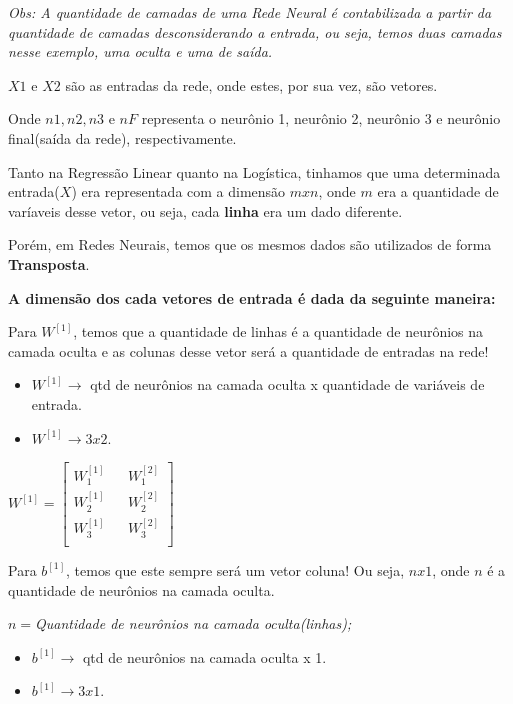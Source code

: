 \documentclass[12pt]{article}
\providecommand{\tightlist}{%
\setlength{\itemsep}{0pt}\setlength{\parskip}{0pt}}
\begin{document}
\emph{Obs: A quantidade de camadas de uma Rede Neural é contabilizada a
partir da quantidade de camadas desconsiderando a entrada, ou seja,
temos duas camadas nesse exemplo, uma oculta e uma de saída.}

\(X1\) e \(X2\) são as entradas da rede, onde estes, por sua vez, são
vetores.

Onde \(n1, n2, n3\) e \(nF\) representa o neurônio 1, neurônio 2,
neurônio 3 e neurônio final(saída da rede), respectivamente.

Tanto na Regressão Linear quanto na Logística, tinhamos que uma
determinada entrada(\(X\)) era representada com a dimensão \(m x n\),
onde \(m\) era a quantidade de varíaveis desse vetor, ou seja, cada
\textbf{linha} era um dado diferente.

Porém, em Redes Neurais, temos que os mesmos dados são utilizados de
forma \textbf{Transposta}.

\textbf{A dimensão dos cada vetores de entrada é dada da seguinte
maneira:}

Para \(W^{[1]}\), temos que a quantidade de linhas é a quantidade de
neurônios na camada oculta e as colunas desse vetor será a quantidade de
entradas na rede!

\begin{itemize}
\tightlist
\item
  \(W^{[1]} \rightarrow\) qtd de neurônios na camada oculta x quantidade
  de variáveis de entrada.
\item
  \(W^{[1]} \rightarrow 3 x 2\).
\end{itemize}

$
W^{[1]} = 
\begin{bmatrix} 
	W_1^{[1]} &&  W_1^{[2]} \\  
	W_2^{[1]} &&  W_2^{[2]} \\  
	W_3^{[1]} &&  W_3^{[2]} \\  
\end{bmatrix}$

Para \(b^{[1]}\), temos que este sempre será um vetor coluna! Ou seja,
\(nx1\), onde \(n\) é a quantidade de neurônios na camada oculta.

$n = $\emph{Quantidade de neurônios na camada oculta(linhas);}

\begin{itemize}
\tightlist
\item
  \(b^{[1]} \rightarrow\) qtd de neurônios na camada oculta x 1.
\item
  \(b^{[1]} \rightarrow 3 x 1\).
\end{itemize}
\end{document}
